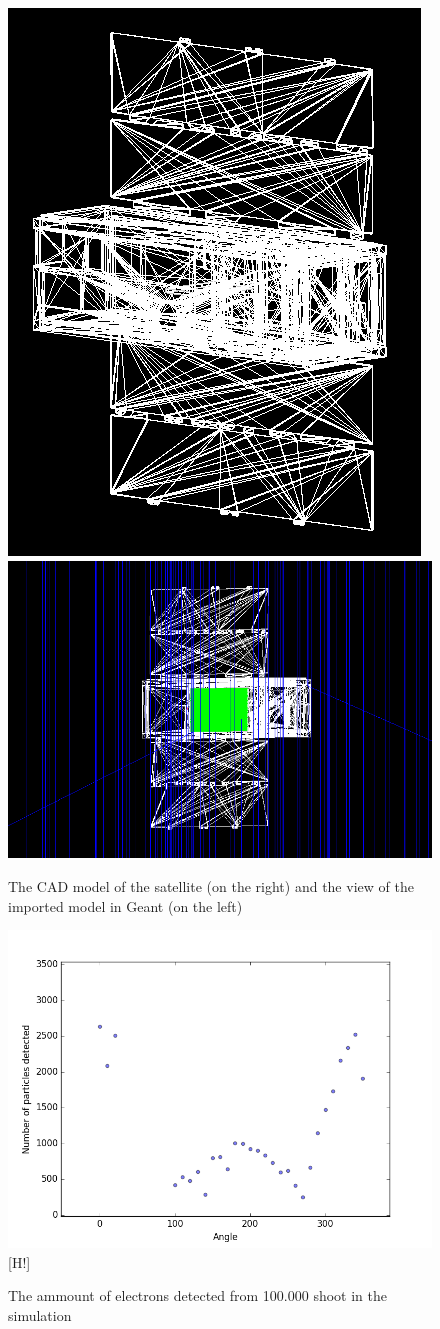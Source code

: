 \documentclass[12pt, a4paper,titlepage]{article}
\numberwithin{equation}{section}
\numberwithin{figure}{section}
\begin{document}
\begin{figure}[h!]
\centering %
\includegraphics[width=.3\textwidth,origin=c,angle=0]{images/satellite.png}
\qquad
\includegraphics[width=.5\textwidth,origin=c,angle=90]{images/8mac.png} 
\caption{\label{fig:i} The CAD model of the satellite (on the right) and the view of the imported model in Geant (on the left)}
\end{figure}

\begin{figure}[h!]
\includegraphics[width=150.0mm]{images/electronabsorption.png}[H!]
\caption{The ammount of electrons detected from 100.000 shoot in the simulation}
\end{figure}
\end{document}
